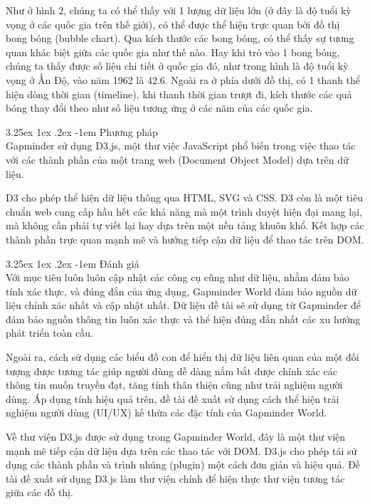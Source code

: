 \documentclass[12pt,a4paper]{article}
\makeatletter
\newcommand{\myparagraph}[1]{\paragraph{#1}\mbox{}\\} %
\renewcommand\paragraph{\@startsection{paragraph}{5}{\z@}%
  {3.25ex \@plus1ex \@minus.2ex}%
  {-1em}%
  {\normalfont\normalsize\bfseries}}
\makeatother
\begin{document}
Như ở hình 2, chúng ta có thể thấy với 1 lượng dữ liệu lớn (ở đây là độ tuổi kỳ vọng ở các quốc gia trên thế giới), có thể được thể hiện trực quan bởi đồ thị bong bóng (bubble chart). Qua kích thước các bong bóng, có thể thấy sự tương quan khác biệt giữa các quốc gia như thế nào. Hay khi trỏ vào 1 bong bóng, chúng ta thấy được số liệu chi tiết ở quốc gia đó, như trong hình là độ tuổi kỳ vọng ở Ấn Độ, vào năm 1962 là 42.6. Ngoài ra ở phía dưới đồ thị, có 1 thanh thể hiện dòng thời gian (timeline), khi thanh thời gian trượt đi, kích thước các quả bóng thay đổi theo như số liệu tương ứng ở các năm của các quốc gia.

\myparagraph{Phương pháp}
Gapminder sử dụng D3.js, một thư việc JavaScript phổ biến trong việc thao tác với các thành phần của một trang web (Document Object Model) dựa trên dữ liệu. 

D3 cho phép thể hiện dữ liệu thông qua HTML, SVG và CSS. D3 còn là một tiêu chuẩn web cung cấp hầu hết các khả năng mà một trình duyệt hiện đại mang lại, mà không cần phải tự viết lại hay dựa trên một nền tảng khuôn khổ. Kết hợp các thành phần trực quan mạnh mẽ và hướng tiếp cận dữ liệu để thao tác trên DOM.

\myparagraph{Đánh giá}
Với mục tiêu luôn luôn cập nhật các công cụ cũng như dữ liệu, nhằm đảm bảo tính xác thực, và đúng đắn của ứng dụng, Gapminder World đảm bảo nguồn dữ liệu chính xác nhất và cập nhật nhất.
Dữ liệu đề tài sẽ sử dụng từ Gapminder để đảm bảo nguồn thông tin luôn xác thực và thể hiện đúng đắn nhất các xu hướng phát triển toàn cầu.

Ngoài ra, cách sử dụng các biểu đồ con để hiển thị dữ liệu liên quan của một đối tượng được tương tác giúp người dùng dễ dàng nắm bắt được chính xác các thông tin muốn truyền đạt, tăng tính thân thiện cũng như trải nghiệm người dùng. Áp dụng tính hiệu quả trên, đề tài đề xuất sử dụng cách thể hiện trải nghiệm người dùng (UI/UX) kế thừa các đặc tính của Gapminder World. 

Về thư viện D3.js được sử dụng trong Gapminder World, đây là một thư viện mạnh mẽ tiếp cận dữ liệu dựa trên các thao tác với DOM. D3.js cho phép tái sử dụng các thành phần và trình nhúng (plugin) một cách đơn giản và hiệu quả. Đề tài đề xuất sử dụng D3.js làm thư viện chính để hiện thực thư viện tương tác giữa các đồ thị.
\end{document}
